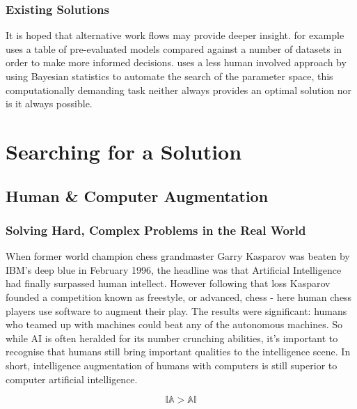 \documentclass[a4paper,11pt,titlepage]{article}
\begin{document}
		\subsubsection{Existing Solutions}
		It is hoped that alternative work flows may provide deeper insight. \cite{Jarrett2009} for example uses a table of pre-evaluated models compared against a number of datasets in order to make more informed decisions. \cite{Bergstra2013} uses a less human involved approach by using Bayesian statistics to automate the search of the parameter space, this computationally demanding task neither always provides an optimal solution nor is it always possible.

\clearpage 

\section{Searching for a Solution}
	\subsection{Human \& Computer Augmentation}

\subsubsection{Solving Hard, Complex Problems in the Real World}

	When former world champion chess grandmaster Garry Kasparov was beaten by IBM’s deep blue in February 1996, the headline was that Artificial Intelligence had finally surpassed human intellect. However following that loss Kasparov founded a competition known as freestyle, or advanced, chess - here human chess players use software to augment their play. The results were significant: humans who teamed up with machines could beat any of the autonomous machines. So while AI is often heralded for its number crunching abilities, it's important to recognise that humans still bring important qualities to the intelligence scene. In short, intelligence augmentation of humans with computers is still superior to computer artificial intelligence.
	
		$$
			\mathbb{IA} > \mathbb{AI}
		$$
	
\end{document}
